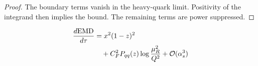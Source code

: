 \begin{proof}
The boundary terms vanish in the heavy-quark limit. Positivity of the
integrand then implies the bound. The remaining terms are power
suppressed.
\end{proof}

\begin{align}
  \frac{d \mathrm{EMD}}{d \tau} &= {x}^{2} (1 - z)^{2} \nonumber \\
  &\quad + C_F^2 P_{qq}(z) \log\frac{\mu_R^2}{Q^2} + \mathcal{O}(\alpha_s^3) \label{eq:3}
\end{align}

